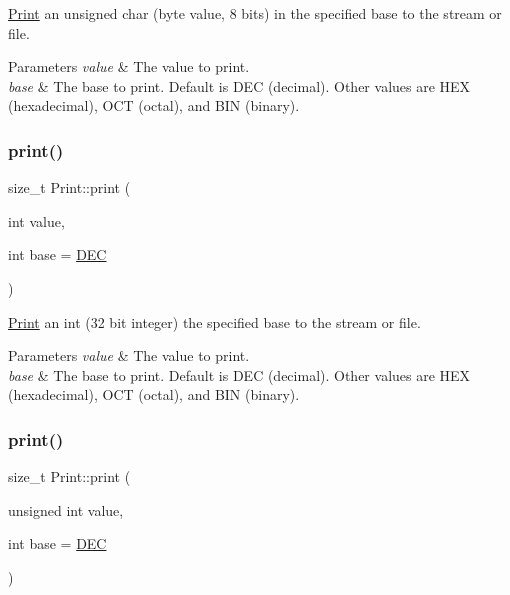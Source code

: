 \hyperlink{class_print}{Print} an unsigned char (byte value, 8 bits) in the specified base to the stream or file. 


\begin{DoxyParams}{Parameters}
{\em value} & The value to print. \\
\hline
{\em base} & The base to print. Default is D\+EC (decimal). Other values are H\+EX (hexadecimal), O\+CT (octal), and B\+IN (binary). \\
\hline
\end{DoxyParams}
\mbox{\label{class_print_aa28ddbde83b14df73b41c919ecc4478f}} 
\subsubsection{\texorpdfstring{print()}{print()}\hspace{0.1cm}{\footnotesize\ttfamily [13/19]}}
{\footnotesize\ttfamily size\+\_\+t Print\+::print (\begin{DoxyParamCaption}\item[{int}]{value,  }\item[{int}]{base = {\ttfamily \hyperlink{docs_2src_2spark__wiring__print_8h_a26e216c38cffa0a9965fa7933ba558b1}{D\+EC}} }\end{DoxyParamCaption})}



\hyperlink{class_print}{Print} an int (32 bit integer) the specified base to the stream or file. 


\begin{DoxyParams}{Parameters}
{\em value} & The value to print. \\
\hline
{\em base} & The base to print. Default is D\+EC (decimal). Other values are H\+EX (hexadecimal), O\+CT (octal), and B\+IN (binary). \\
\hline
\end{DoxyParams}
\mbox{\label{class_print_afcd7d3a184df961a502643e4fb638c52}} 
\subsubsection{\texorpdfstring{print()}{print()}\hspace{0.1cm}{\footnotesize\ttfamily [14/19]}}
{\footnotesize\ttfamily size\+\_\+t Print\+::print (\begin{DoxyParamCaption}\item[{unsigned int}]{value,  }\item[{int}]{base = {\ttfamily \hyperlink{docs_2src_2spark__wiring__print_8h_a26e216c38cffa0a9965fa7933ba558b1}{D\+EC}} }\end{DoxyParamCaption})}



